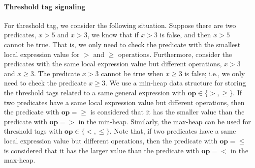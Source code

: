 \documentclass[preprint]{sigplanconf}
\newtheorem{definition}{Definition}
\begin{document}
\paragraph{Threshold tag signaling}
For threshold tag, we consider the following situation. Suppose there are two 
predicates, $x > 5$ and $x > 3$, we know that if $x > 3$ is false, and then 
$x > 5$ cannot be true. That is, we only need to check the predicate with the 
smallest local expression value for $>$ and $\ge$ operations. Furthermore, 
consider the predicates with the same local expression value but different 
operations, $x > 3$ and $x \ge 3$. The predicate $x > 3$ cannot be true when 
$x \ge 3$ is false; i.e., we only need to check the predicate $x \ge 3$. We use
a min-heap data structure for storing the threshold tags related to a same 
general expression with $\boldsymbol{op} \in \{>, \ge\}$. If two predicates 
have a same local expression value but different operations, then the predicate 
with $\boldsymbol{op}=\ge$ is considered that it has the smaller value than the 
predicate with $\boldsymbol{op}=>$ in the min-heap.
Similarly, the max-heap can be used for threshold tags with $\boldsymbol{op}
\in \{<, \le\}$. Note that, if two predicates have a same local expression 
value but different operations, then the predicate 
with $\boldsymbol{op}=\le$ is considered that it has the larger value than the 
predicate with $\boldsymbol{op}= <$ in the max-heap.


\end{document}
